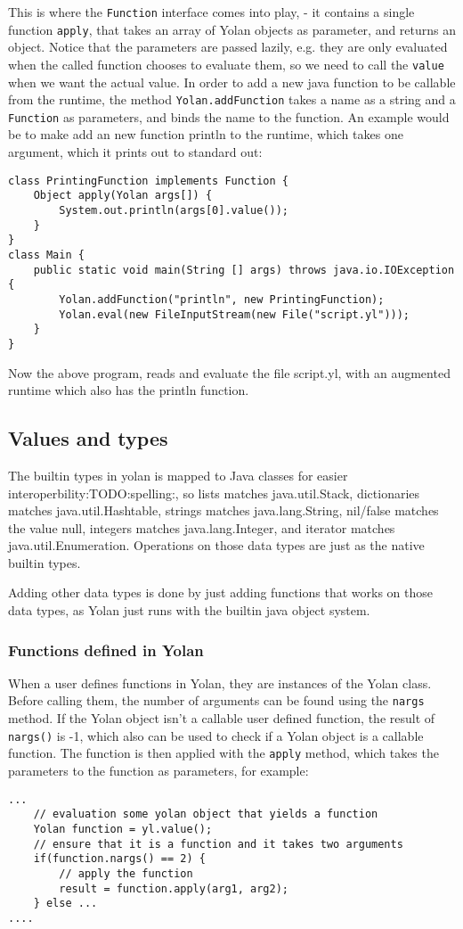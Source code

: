 This is where the \verb|Function| interface comes into play, - it contains a single function \verb|apply|, that takes an array of Yolan objects as parameter, and returns an object.
Notice that the parameters are passed lazily, e.g. they are only evaluated when the called function chooses to evaluate them, so we need to call the \verb|value| when we want the actual value.
In order to add a new java function to be callable from the runtime, the method \verb|Yolan.addFunction| takes a name as a string and a \verb|Function| as parameters, and binds the name to the function. An example would be to make add an new function println to the runtime, which takes one argument, which it prints out to standard out:
{\scriptsize 
\begin{verbatim}
class PrintingFunction implements Function {
    Object apply(Yolan args[]) {
        System.out.println(args[0].value());
    }
}
class Main {
    public static void main(String [] args) throws java.io.IOException {
        Yolan.addFunction("println", new PrintingFunction);
        Yolan.eval(new FileInputStream(new File("script.yl")));
    }
}
\end{verbatim}
}
Now the above program, reads and evaluate the file script.yl, with an augmented runtime which also has the println function.

\subsection{Values and types}
The builtin types in yolan is mapped to Java classes for easier interoperbility:TODO:spelling:,
so lists matches java.util.Stack, dictionaries matches java.util.Hashtable, strings matches java.lang.String, nil/false matches the value null, integers matches java.lang.Integer, and iterator matches java.util.Enumeration. 
Operations on those data types are just as the native builtin types. 

Adding other data types is done by just adding functions that works on those data types, as Yolan just runs with the builtin java object system.

\subsubsection{Functions defined in Yolan}
When a user defines functions in Yolan, they are instances of the Yolan class. 
Before calling them, the number of arguments can be found using the \verb|nargs| method.
If the Yolan object isn't a callable user defined function, the result of \verb|nargs()| is -1, which also can be used to check if a Yolan object is a callable function.
The function is then applied with the \verb|apply| method, which takes the parameters to the function as parameters, for example:
{\scriptsize 
\begin{verbatim}
...
    // evaluation some yolan object that yields a function
    Yolan function = yl.value();
    // ensure that it is a function and it takes two arguments
    if(function.nargs() == 2) {
        // apply the function 
        result = function.apply(arg1, arg2);
    } else ...
....
\end{verbatim}
}

